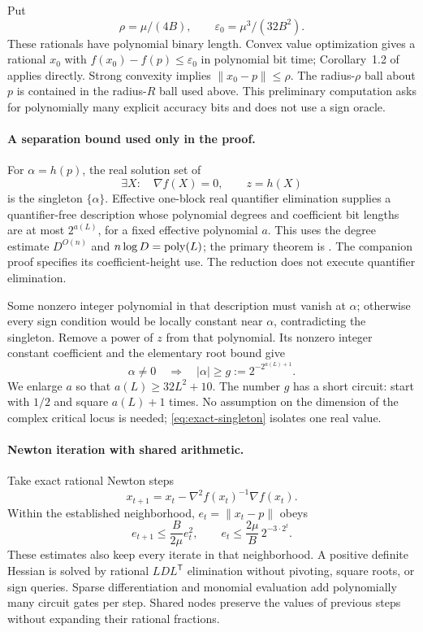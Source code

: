 Put
\[
 \rho=\mu/(4B),\qquad \varepsilon_0=\mu^3/(32B^2).
\]
These rationals have polynomial binary length. Convex value
optimization gives a rational $x_0$ with
$f(x_0)-f(p)\le\varepsilon_0$ in polynomial bit time;
Corollary~1.2 of \citet{SlotSteurerWiedmer2025} applies directly. Strong convexity
implies $\|x_0-p\|\le\rho$. The radius-$\rho$ ball about $p$
is contained in the radius-$R$ ball used above. This preliminary
computation asks for polynomially many explicit accuracy bits and
does not use a sign oracle.

\paragraph{A separation bound used only in the proof.}
For $\alpha=h(p)$, the real solution set of
\begin{equation}
 \exists X:\quad\nabla f(X)=0,\qquad z=h(X)
 \label{eq:exact-singleton}
\end{equation}
is the singleton $\{\alpha\}$. Effective one-block real quantifier
elimination supplies a quantifier-free description whose polynomial
degrees and coefficient bit lengths are at most $2^{a(L)}$, for a
fixed effective polynomial $a$. This uses the degree estimate
$D^{O(n)}$ and $n\log D=\operatorname{poly}(L)$; the
primary theorem is \citet[Theorem~2.27]{Basu2014}.
The companion proof specifies its coefficient-height use.
The reduction does not execute quantifier elimination.

Some nonzero integer polynomial in that description must vanish at
$\alpha$; otherwise every sign condition would be locally constant
near $\alpha$, contradicting the singleton. Remove a power of $z$
from that polynomial. Its nonzero integer constant coefficient and
the elementary root bound give
\begin{equation}
 \alpha\ne0\quad\Longrightarrow\quad
 |\alpha|\ge g:=2^{-2^{a(L)+1}}.
 \label{eq:exact-separation}
\end{equation}
We enlarge $a$ so that $a(L)\ge32L^2+10$. The number $g$ has a
short circuit: start with $1/2$ and square $a(L)+1$ times. No
assumption on the dimension of the complex critical locus is needed;
\eqref{eq:exact-singleton} isolates one real value.

\paragraph{Newton iteration with shared arithmetic.}
Take exact rational Newton steps
\[
 x_{t+1}=x_t-\nabla^2f(x_t)^{-1}\nabla f(x_t).
\]
Within the established neighborhood, $e_t=\|x_t-p\|$ obeys
\[
 e_{t+1}\le\frac{B}{2\mu}e_t^2,\qquad
 e_t\le\frac{2\mu}{B}\,2^{-3\cdot2^t}.
\]
These estimates also keep every iterate in that neighborhood. A
positive definite Hessian is solved by rational
$LDL^{\mathsf T}$ elimination without pivoting, square roots, or
sign queries. Sparse differentiation and monomial evaluation add
polynomially many circuit gates per step. Shared nodes preserve the
values of previous steps without expanding their rational fractions.

